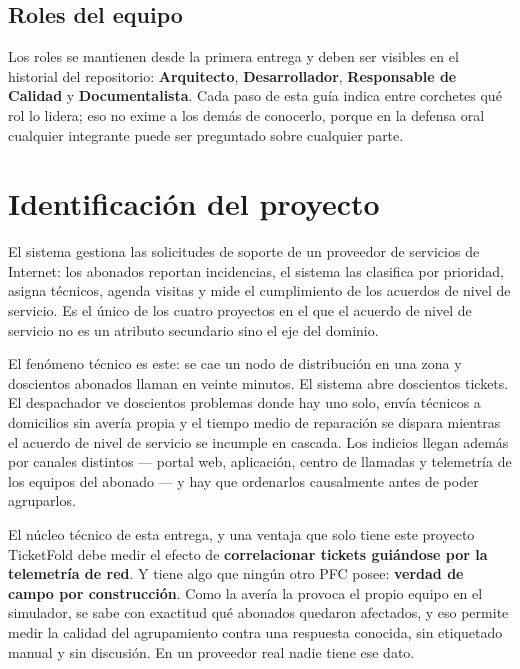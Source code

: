 \documentclass[11pt,a4paper]{article}
\begin{document}
	\subsection{Roles del equipo}
	
	Los roles se mantienen desde la primera entrega y deben ser visibles en el historial del repositorio: \textbf{Arquitecto}, \textbf{Desarrollador}, \textbf{Responsable de Calidad} y \textbf{Documentalista}. Cada paso de esta guía indica entre corchetes qué rol lo lidera; eso no exime a los demás de conocerlo, porque en la defensa oral cualquier integrante puede ser preguntado sobre cualquier parte.
	
	\section{Identificación del proyecto}
	
	El sistema gestiona las solicitudes de soporte de un proveedor de servicios de Internet: los abonados reportan incidencias, el sistema las clasifica por prioridad, asigna técnicos, agenda visitas y mide el cumplimiento de los acuerdos de nivel de servicio. Es el único de los cuatro proyectos en el que el acuerdo de nivel de servicio no es un atributo secundario sino el eje del dominio.
	
	El fenómeno técnico es este: se cae un nodo de distribución en una zona y doscientos abonados llaman en veinte minutos. El sistema abre doscientos tickets. El despachador ve doscientos problemas donde hay uno solo, envía técnicos a domicilios sin avería propia y el tiempo medio de reparación se dispara mientras el acuerdo de nivel de servicio se incumple en cascada. Los indicios llegan además por canales distintos --- portal web, aplicación, centro de llamadas y telemetría de los equipos del abonado --- y hay que ordenarlos causalmente antes de poder agruparlos.
	
	\begin{defBox}{El núcleo técnico de esta entrega, y una ventaja que solo tiene este proyecto}
		TicketFold debe medir el efecto de \textbf{correlacionar tickets guiándose por la telemetría de red}. Y tiene algo que ningún otro PFC posee: \textbf{verdad de campo por construcción}. Como la avería la provoca el propio equipo en el simulador, se sabe con exactitud qué abonados quedaron afectados, y eso permite medir la calidad del agrupamiento contra una respuesta conocida, sin etiquetado manual y sin discusión. En un proveedor real nadie tiene ese dato.
	\end{defBox}
	
\end{document}
